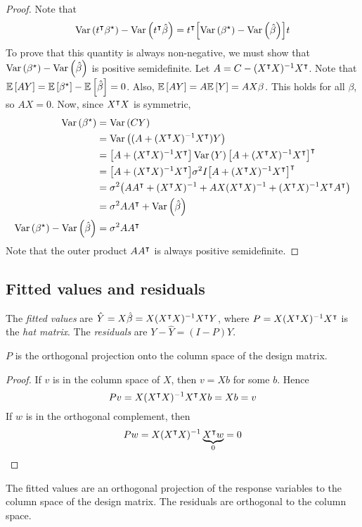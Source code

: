 \begin{proof}
	Note that
	\[ \operatorname{Var}\left({t^\intercal \beta^\star}\right) - \operatorname{Var}\left({t^\intercal \hat \beta}\right) = t^\intercal \qty[\operatorname{Var}\left({\beta^\star}\right) - \operatorname{Var}\left({\hat\beta}\right)] t \]
	To prove that this quantity is always non-negative, we must show that \( \operatorname{Var}\left({\beta^\star}\right) - \operatorname{Var}\left({\hat\beta}\right) \) is positive semidefinite.
	Let \( A = C - (X^\intercal X)^{-1} X^\intercal \).
	Note that \( \mathbb{E}\left[{AY}\right] = \mathbb{E}\left[{\beta^\star}\right] - \mathbb{E}\left[{\hat\beta}\right] = 0 \).
	Also, \( \mathbb{E}\left[{AY}\right] = A \mathbb{E}\left[{Y}\right] = AX\beta \).
	This holds for all \( \beta \), so \( AX = 0 \).
	Now, since \( X^\intercal X \) is symmetric,
	\begin{align*}
		\operatorname{Var}\left({\beta^\star}\right) &= \operatorname{Var}\left({CY}\right) \\
		&= \operatorname{Var}\left({(A+(X^\intercal X)^{-1} X^\intercal)Y}\right) \\
		&= \qty[A+(X^\intercal X)^{-1} X^\intercal] \operatorname{Var}\left({Y}\right) \qty[A+(X^\intercal X)^{-1} X^\intercal]^\intercal \\
		&= \qty[A+(X^\intercal X)^{-1} X^\intercal] \sigma^2 I \qty[A+(X^\intercal X)^{-1} X^\intercal]^\intercal \\
		&= \sigma^2 \qty(A A^\intercal + (X^\intercal X)^{-1} + AX(X^\intercal X)^{-1} + (X^\intercal X)^{-1} X^\intercal A^\intercal) \\
		&= \sigma^2 AA^\intercal + \operatorname{Var}\left({\hat \beta}\right) \\
		\operatorname{Var}\left({\beta^\star}\right) - \operatorname{Var}\left({\hat\beta}\right) &= \sigma^2 AA^\intercal
	\end{align*}
	Note that the outer product \( A A^\intercal \) is always positive semidefinite.
\end{proof}

\subsection{Fitted values and residuals}
\begin{definition}
	The \textit{fitted values} are \( \hat Y = X \hat \beta = X(X^\intercal X)^{-1} X^\intercal Y \), where \( P = X (X^\intercal X)^{-1} X^\intercal \) is the \textit{hat matrix}.
	The \textit{residuals} are \( Y - \hat Y = (I-P)Y \).
\end{definition}
\begin{proposition}
	\( P \) is the orthogonal projection onto the column space of the design matrix.
\end{proposition}
\begin{proof}
	If \( v \) is in the column space of \( X \), then \( v = Xb \) for some \( b \).
	Hence
	\[ Pv = X(X^\intercal X)^{-1} X^\intercal X b = Xb = v \]
	If \( w \) is in the orthogonal complement, then
	\[ Pw = X(X^\intercal X)^{-1} \underbrace{X^\intercal w}_{0} = 0 \]
\end{proof}
\begin{corollary}
	The fitted values are an orthogonal projection of the response variables to the column space of the design matrix.
	The residuals are orthogonal to the column space.
\end{corollary}

